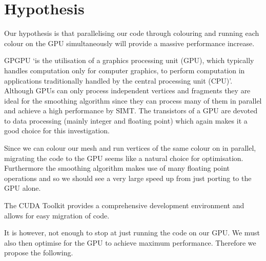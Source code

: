 \section{Hypothesis}
Our hypothesis is that parallelising our code through colouring and running each colour on the GPU simultaneously will provide a massive performance increase.


GPGPU `is the utilisation of a graphics processing unit (GPU), which typically handles computation only for computer graphics, to perform computation in applications traditionally handled by the central processing unit (CPU)'\cite{gpgpu}.
Although GPUs can only process independent vertices and fragments they are ideal for the smoothing algorithm since they can process many of them in parallel and achieve a high performance by SIMT. The transistors of a GPU are devoted to data processing (mainly integer and floating point) which again makes it a good choice for this investigation\cite{lec7}.


Since we can colour our mesh and run vertices of the same colour on in parallel, migrating the code to the GPU seems like a natural choice for optimisation. Furthermore the smoothing algorithm makes use of many floating point operations and so we should see a very large speed up from just porting to the GPU alone.

The CUDA Toolkit provides a comprehensive development environment and allows for easy migration of code.




It is however, not enough to stop at just running the code on our GPU. We must also then optimise for the GPU to achieve maximum performance. Therefore we propose the following.





